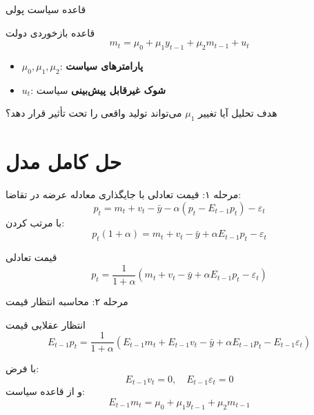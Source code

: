 \documentclass[aspectratio=169,11pt]{beamer}
\newcommand{\highlight}[1]{\textcolor{AccentOrange}{\textbf{#1}}}
\newcommand{\keyword}[1]{\textcolor{MainBlue}{\textbf{#1}}}
\begin{document}
\begin{frame}{قاعده سیاست پولی}
  \begin{block}{قاعده بازخوردی دولت}
    \centering
    \large
    \[
      m_t = \mu_0 + \mu_1 y_{t-1} + \mu_2 m_{t-1} + u_t
    \]
  \end{block}
  \vspace{0.3cm}
  \begin{itemize}
    \item $\mu_0, \mu_1, \mu_2$: \keyword{پارامترهای سیاست}
    \item $u_t$: \highlight{شوک غیرقابل پیش‌بینی} سیاست
  \end{itemize}
  \vspace{0.3cm}
  \begin{alertblock}{هدف تحلیل}
    آیا تغییر $\mu_1$ می‌تواند تولید واقعی را تحت تأثیر قرار دهد؟
  \end{alertblock}
\end{frame}

\section{حل کامل مدل}

\begin{frame}{مرحله ۱: قیمت تعادلی}
  با جایگذاری معادله عرضه در تقاضا:
  \[
    p_t = m_t + v_t - \bar{y} - \alpha(p_t - E_{t-1}p_t) - \varepsilon_t
  \]
  \vspace{0.3cm}
  با مرتب کردن:
  \[
    p_t (1 + \alpha) = m_t + v_t - \bar{y} + \alpha E_{t-1}p_t - \varepsilon_t
  \]
  \vspace{0.3cm}
  \begin{block}{قیمت تعادلی}
    \centering
    \[
      p_t = \frac{1}{1+\alpha}\left(m_t + v_t - \bar{y} + \alpha E_{t-1}p_t - \varepsilon_t\right)
    \]
  \end{block}
\end{frame}

\begin{frame}{مرحله ۲: محاسبه انتظار قیمت}
  \begin{block}{انتظار عقلایی قیمت}
    \[
      E_{t-1}p_t = \frac{1}{1+\alpha}\left(E_{t-1}m_t + E_{t-1}v_t - \bar{y} + \alpha E_{t-1}p_t - E_{t-1}\varepsilon_t\right)
    \]
  \end{block}
  \vspace{0.3cm}
  با فرض:
  \[
    E_{t-1}v_t = 0, \quad E_{t-1}\varepsilon_t = 0
  \]
  و از قاعده سیاست:
  \[
    E_{t-1}m_t = \mu_0 + \mu_1 y_{t-1} + \mu_2 m_{t-1}
  \]
\end{frame}
\end{document}
